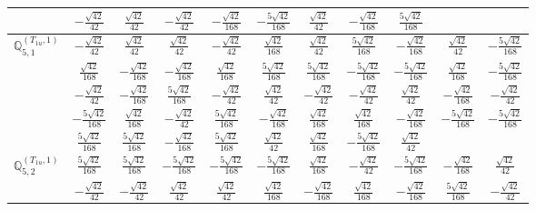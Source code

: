 \documentclass[fleqn,10pt,landscape]{article}
\begin{document}
\begin{itemize}
{\begin{center}
\begin{longtable}{ccccccccccc}
& $ - \frac{\sqrt{42}}{42} $ & $ \frac{\sqrt{42}}{42} $ & $ - \frac{\sqrt{42}}{42} $ & $ - \frac{\sqrt{42}}{168} $ & $ - \frac{5 \sqrt{42}}{168} $ & $ \frac{\sqrt{42}}{42} $ & $ - \frac{\sqrt{42}}{168} $ & $ \frac{5 \sqrt{42}}{168} $ & $  $ & $  $ \\ \hline
$\mathbb{Q}_{5,1}^{(T_{1u},1)}$ & $ - \frac{\sqrt{42}}{42} $ & $ \frac{\sqrt{42}}{42} $ & $ \frac{\sqrt{42}}{42} $ & $ - \frac{\sqrt{42}}{42} $ & $ \frac{\sqrt{42}}{168} $ & $ \frac{\sqrt{42}}{42} $ & $ \frac{5 \sqrt{42}}{168} $ & $ - \frac{\sqrt{42}}{168} $ & $ \frac{\sqrt{42}}{42} $ & $ - \frac{5 \sqrt{42}}{168} $ \\
& $ \frac{\sqrt{42}}{168} $ & $ - \frac{\sqrt{42}}{168} $ & $ - \frac{\sqrt{42}}{168} $ & $ \frac{\sqrt{42}}{168} $ & $ \frac{5 \sqrt{42}}{168} $ & $ \frac{5 \sqrt{42}}{168} $ & $ - \frac{5 \sqrt{42}}{168} $ & $ - \frac{5 \sqrt{42}}{168} $ & $ \frac{\sqrt{42}}{168} $ & $ - \frac{5 \sqrt{42}}{168} $ \\
& $ - \frac{\sqrt{42}}{42} $ & $ - \frac{\sqrt{42}}{168} $ & $ \frac{5 \sqrt{42}}{168} $ & $ - \frac{\sqrt{42}}{42} $ & $ \frac{\sqrt{42}}{42} $ & $ - \frac{\sqrt{42}}{42} $ & $ - \frac{\sqrt{42}}{42} $ & $ \frac{\sqrt{42}}{42} $ & $ - \frac{\sqrt{42}}{168} $ & $ - \frac{\sqrt{42}}{42} $ \\
& $ - \frac{5 \sqrt{42}}{168} $ & $ \frac{\sqrt{42}}{168} $ & $ - \frac{\sqrt{42}}{42} $ & $ \frac{5 \sqrt{42}}{168} $ & $ - \frac{\sqrt{42}}{168} $ & $ \frac{\sqrt{42}}{168} $ & $ \frac{\sqrt{42}}{168} $ & $ - \frac{\sqrt{42}}{168} $ & $ - \frac{5 \sqrt{42}}{168} $ & $ - \frac{5 \sqrt{42}}{168} $ \\
& $ \frac{5 \sqrt{42}}{168} $ & $ \frac{5 \sqrt{42}}{168} $ & $ - \frac{\sqrt{42}}{168} $ & $ \frac{5 \sqrt{42}}{168} $ & $ \frac{\sqrt{42}}{42} $ & $ \frac{\sqrt{42}}{168} $ & $ - \frac{5 \sqrt{42}}{168} $ & $ \frac{\sqrt{42}}{42} $ & $  $ & $  $ \\ \hline
$\mathbb{Q}_{5,2}^{(T_{1u},1)}$ & $ \frac{5 \sqrt{42}}{168} $ & $ \frac{5 \sqrt{42}}{168} $ & $ - \frac{5 \sqrt{42}}{168} $ & $ - \frac{5 \sqrt{42}}{168} $ & $ - \frac{5 \sqrt{42}}{168} $ & $ \frac{\sqrt{42}}{168} $ & $ - \frac{\sqrt{42}}{42} $ & $ - \frac{5 \sqrt{42}}{168} $ & $ - \frac{\sqrt{42}}{168} $ & $ \frac{\sqrt{42}}{42} $ \\
& $ - \frac{\sqrt{42}}{42} $ & $ - \frac{\sqrt{42}}{42} $ & $ \frac{\sqrt{42}}{42} $ & $ \frac{\sqrt{42}}{42} $ & $ \frac{\sqrt{42}}{168} $ & $ - \frac{\sqrt{42}}{168} $ & $ \frac{\sqrt{42}}{168} $ & $ - \frac{\sqrt{42}}{168} $ & $ \frac{5 \sqrt{42}}{168} $ & $ - \frac{\sqrt{42}}{42} $ \\

\end{longtable}
\end{center}}
\end{itemize}
\end{document}
